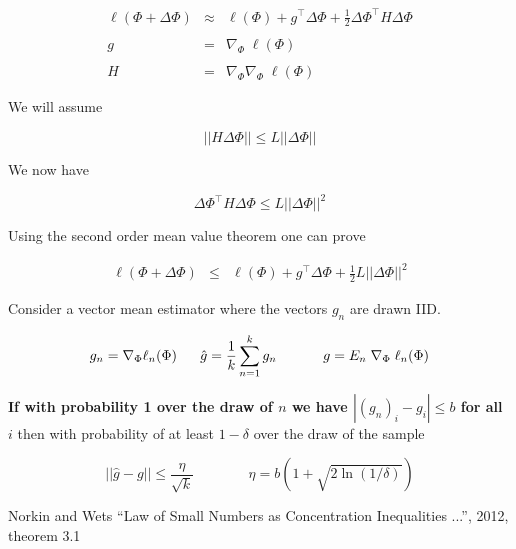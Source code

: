 {{\begin{eqnarray*}
  \ell(\Phi + \Delta \Phi) & \approx & \ell(\Phi) + g^\top \Delta \Phi + \frac{1}{2} \Delta \Phi^\top H \Delta \Phi \\
  \\
  g & = & \nabla_\Phi\;\ell(\Phi) \\
  \\
  H & = & \nabla_\Phi \nabla_\Phi\; \ell(\Phi)
\end{eqnarray*}



We will assume

$$||H\Delta \Phi|| \leq L||\Delta \Phi||$$

We now have

\vfill
$$\Delta \Phi^\top H \Delta \Phi \leq L ||\Delta \Phi||^2$$

\vfill
Using the second order mean value theorem one can prove

\begin{eqnarray*}
  \ell(\Phi + \Delta \Phi)  & \leq &    \ell(\Phi) + g^\top \Delta \Phi + \frac{1}{2} L ||\Delta \Phi||^2
\end{eqnarray*}



Consider a vector mean estimator where the vectors $g_n$ are drawn IID.

$$g_n = \nabla_\Phi \ell_n(\Phi) \;\;\;\;\;\;\hat{g} = \frac{1}{k} \sum_{n=1}^k g_n \;\;\;\; \;\;\;\;\;\;\;\; g = E_{n}\;\nabla_\Phi\;\ell_n(\Phi)$$

\vfill
{\bf If with probability 1 over the draw of $n$ we have $|(g_n)_i - g_i| \leq b$ for all $i$} then with probability of at least $1-\delta$ over the draw of the sample

\vfill

$$||\hat{g} - g|| \leq \frac{\eta}{\sqrt{k}} \;\;\;\;\;\;\;\;\;\;\;\;\;\; \eta = b\left(1 + \sqrt{2 \ln (1/ \delta) }\right)$$


\vfill
{\huge Norkin and Wets ``Law of Small Numbers as Concentration Inequalities ...'', 2012, theorem 3.1}

}}
